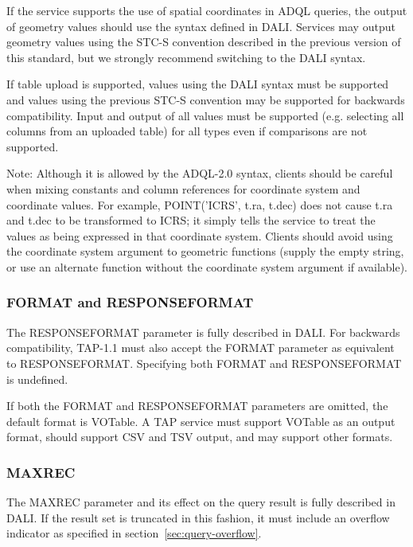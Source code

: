 \documentclass[11pt,letter]{ivoa}
\begin{document}
If the service supports the use of spatial coordinates in ADQL queries, the output of 
geometry values should use the syntax defined in DALI. Services may output geometry values
using the STC-S convention described in the previous version of this standard, but we 
strongly recommend switching to the DALI syntax. 

If table upload is supported, values using the DALI syntax must be supported and values using 
the previous STC-S convention may be supported for backwards compatibility. Input and output of 
all values must be supported (e.g. selecting all columns from an uploaded table) for all types 
even if comparisons are not supported.

Note: Although it is allowed by the ADQL-2.0 syntax, clients should be careful when 
mixing constants and column references for coordinate system and coordinate 
values. For example, POINT('ICRS', t.ra, t.dec) does not cause t.ra and t.dec to 
be transformed to ICRS; it simply tells the service to treat the values  as 
being expressed in that coordinate system. Clients should avoid using the coordinate 
system argument to geometric functions (supply the empty string, or use an 
alternate function without the coordinate system argument if available).

\subsubsection{FORMAT and RESPONSEFORMAT}
\label{sec:RESPONSEFORMAT}

The RESPONSEFORMAT parameter is fully described in DALI. For 
backwards 
compatibility, TAP-1.1 must also accept the FORMAT parameter as equivalent to 
RESPONSEFORMAT.  
Specifying both FORMAT and RESPONSEFORMAT is undefined.

If both the FORMAT and RESPONSEFORMAT parameters are omitted, the
default format is VOTable.  A TAP service must support VOTable as an
output format, should support CSV and TSV output, and may support other
formats.

\subsubsection{MAXREC}
\label{sec:MAXREC}

The MAXREC parameter and its effect on the query result is fully described in 
DALI. If the result set is truncated in this fashion, it must 
include an overflow indicator as specified in section~\ref{sec:query-overflow}.
\end{document}
